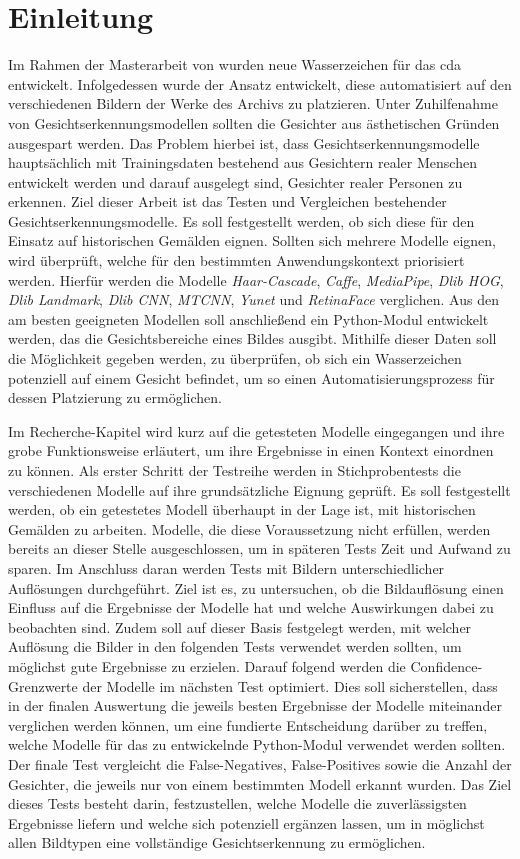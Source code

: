 \chapter{Einleitung}
%
Im Rahmen der Masterarbeit von \cite{pagelsdorf2024} wurden neue Wasserzeichen für das \gls{cda} entwickelt. Infolgedessen wurde der Ansatz entwickelt, diese automatisiert auf den verschiedenen Bildern der Werke des Archivs zu platzieren. Unter Zuhilfenahme von Gesichtserkennungsmodellen sollten die Gesichter aus ästhetischen Gründen ausgespart werden. Das Problem hierbei ist, dass Gesichtserkennungsmodelle hauptsächlich mit Trainingsdaten bestehend aus Gesichtern realer Menschen entwickelt werden und darauf ausgelegt sind, Gesichter realer Personen zu erkennen. Ziel dieser Arbeit ist das Testen und Vergleichen bestehender Gesichtserkennungsmodelle. Es soll festgestellt werden, ob sich diese für den Einsatz auf historischen Gemälden eignen. Sollten sich mehrere Modelle eignen, wird überprüft, welche für den bestimmten Anwendungskontext priorisiert werden. Hierfür werden die Modelle \textit{Haar-Cascade}, \textit{Caffe}, \textit{MediaPipe}, \textit{Dlib HOG}, \textit{Dlib Landmark}, \textit{Dlib CNN}, \textit{MTCNN}, \textit{Yunet} und \textit{RetinaFace} verglichen. Aus den am besten geeigneten Modellen soll anschließend ein Python-Modul entwickelt werden, das die Gesichtsbereiche eines Bildes ausgibt. Mithilfe dieser Daten soll die Möglichkeit gegeben werden, zu überprüfen, ob sich ein Wasserzeichen potenziell auf einem Gesicht befindet, um so einen Automatisierungsprozess für dessen Platzierung zu ermöglichen.

Im Recherche-Kapitel wird kurz auf die getesteten Modelle eingegangen und ihre grobe Funktionsweise erläutert, um ihre Ergebnisse in einen Kontext einordnen zu können.
Als erster Schritt der Testreihe werden in Stichprobentests die verschiedenen Modelle auf ihre grundsätzliche Eignung geprüft. Es soll festgestellt werden, ob ein getestetes Modell überhaupt in der Lage ist, mit historischen Gemälden zu arbeiten. Modelle, die diese Voraussetzung nicht erfüllen, werden bereits an dieser Stelle ausgeschlossen, um in späteren Tests Zeit und Aufwand zu sparen.
Im Anschluss daran werden Tests mit Bildern unterschiedlicher Auflösungen durchgeführt. Ziel ist es, zu untersuchen, ob die Bildauflösung einen Einfluss auf die Ergebnisse der Modelle hat und welche Auswirkungen dabei zu beobachten sind. Zudem soll auf dieser Basis festgelegt werden, mit welcher Auflösung die Bilder in den folgenden Tests verwendet werden sollten, um möglichst gute Ergebnisse zu erzielen.
Darauf folgend werden die Confidence-Grenzwerte der Modelle im nächsten Test optimiert. Dies soll sicherstellen, dass in der finalen Auswertung die jeweils besten Ergebnisse der Modelle miteinander verglichen werden können, um eine fundierte Entscheidung darüber zu treffen, welche Modelle für das zu entwickelnde Python-Modul verwendet werden sollten.
Der finale Test vergleicht die False-Negatives, False-Positives sowie die Anzahl der Gesichter, die jeweils nur von einem bestimmten Modell erkannt wurden. Das Ziel dieses Tests besteht darin, festzustellen, welche Modelle die zuverlässigsten Ergebnisse liefern und welche sich potenziell ergänzen lassen, um in möglichst allen Bildtypen eine vollständige Gesichtserkennung zu ermöglichen.
